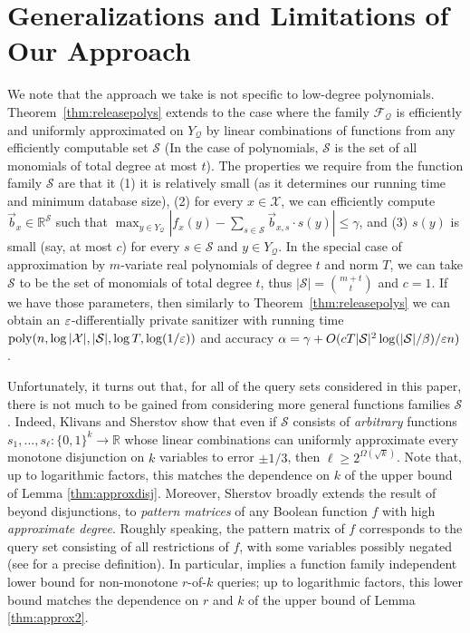 \documentclass[11pt]{article}
\newcommand\R{\mathbb{R}}
\newcommand\cF{\mathcal{F}}
\newcommand\cQ{\mathcal{Q}}
\newcommand\cX{\mathcal{X}}
\newcommand\poly{\mathrm{poly}}
\theoremstyle{definition}
\begin{document}
\section{Generalizations and Limitations of Our Approach}
We note that the approach we take is not specific to low-degree polynomials.  Theorem~\ref{thm:releasepolys} extends to the case where the family $\cF_{\cQ}$ is efficiently and uniformly approximated on $Y_{\cQ}$ by linear combinations of functions from any efficiently computable set $\mathcal{S}$ (In the case of polynomials, $\mathcal{S}$ is the set of all monomials of total degree at most $t$).  The properties we require from the function family $\mathcal{S}$ are that it (1) it is relatively small (as it determines our running time and minimum database size), (2) for every $x \in \cX$, we can efficiently compute $\vec{b}_{x} \in \R^{\mathcal{S}}$ such that $\max_{y \in Y_{\cQ}} |f_{x}(y) - \sum_{s \in \mathcal{S}} \vec{b}_{x, s} \cdot s(y)| \leq \gamma$, and (3) $s(y)$ is small (say, at most $c$) for every $s \in \mathcal{S}$ and $y \in Y_{\cQ}$.  In the special case of approximation by $m$-variate real polynomials of degree $t$ and norm $T$, we can take $\mathcal{S}$ to be the set of monomials of total degree $t$, thus $|\mathcal{S}| = \binom{m+t}{t}$ and $c = 1$.  If we have those parameters, then similarly to Theorem~\ref{thm:releasepolys} we can obtain an $\varepsilon$-differentially private sanitizer with running time $\poly(n, \log|\cX|, |\mathcal{S}|, \log T, \log(1/\eps))$ and accuracy $\alpha = \gamma + O(c T |\mathcal{S}|^2 \log(|\mathcal{S}|/\beta)/\varepsilon n)$.

Unfortunately, it turns out that, for all of the query sets considered in this paper, there is not much to be gained from considering more general functions families $\mathcal{S}$. Indeed, Klivans and Sherstov \cite[Theorem 1.1]{KlivansSh10} show that even
if $\mathcal{S}$ consists of \emph{arbitrary} functions $s_1, \dots, s_{\ell}: \{0, 1\}^k \rightarrow \mathbb{R}$
whose linear combinations can uniformly approximate every monotone disjunction on $k$ variables to error $\pm 1/3$, then $\ell \geq 2^{\Omega(\sqrt{k})}$. Note that, up to logarithmic factors, this matches the dependence on $k$ of the upper bound of Lemma \ref{thm:approxdisj}. 
Moreover, Sherstov \cite[Theorem 8.1]{Sh11pattern} broadly extends the result of \cite{KlivansSh10} beyond disjunctions, to \emph{pattern matrices} of any Boolean function $f$
with high \emph{approximate degree}. Roughly speaking, the pattern matrix of $f$ corresponds to the query set consisting of all restrictions of $f$, with some variables possibly negated (see 
\cite{Sh11pattern} for a precise definition). In particular, \cite[Theorem 8.1]{Sh11pattern} implies a function family independent lower bound for non-monotone $r$-of-$k$ queries;
up to logarithmic factors, this lower bound matches the dependence on $r$ and $k$ of the upper bound of Lemma \ref{thm:approx2}.
\end{document}
